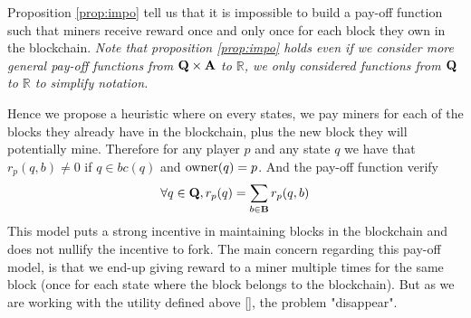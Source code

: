 Proposition \ref{prop:impo} tell us that it is impossible to build a pay-off function such that miners receive reward once and only once for each block they own in the blockchain. \textit{Note that proposition \ref{prop:impo} holds even if we consider more general pay-off functions from $\mathbf{Q} \times \mathbf{A}$ to $\mathbb{R}$, we only considered functions from $\mathbf{Q}$ to $\mathbb{R}$ to simplify notation.}

\iffalse
\etienne{This part can go in relative work now i guess ? or a slightly different and shorter version. (To discuss with Marcelo)}
A pay-off function has been proposed in \cite{}, such that at every level of the state's tree only the first block which has been confirmed by $\delta \in \mathbb{N}$ blocks give reward to his owner. Due to this constraint if a fork longer than $\delta$ blocks would happen, some blocks belonging to the new blockchain won't give any reward to their owners. As a matter of fact the model nullify the incentive of performing a fork longer than $\delta$ \cite{}. One could argue that a fork longer than $\delta$ would destroy the market confidence and therefore can be ignored. It might be the case with the current state of crypto-currencies, but as the technology become more widely adopted (government or bank), such argument can not be use any-more.
\fi

Hence we propose a heuristic where on every states, we pay miners for each of the blocks they already have in the blockchain, plus the new block they will potentially mine. Therefore for any player $p$ and any state $q$ we have that $r_p(q,b) \neq 0$ if $q \in bc(q)$ and $\text{\rm owner}(q) = p$. And the pay-off function verify\begin{equation*}
\forall q \in \mathbf{Q}, r_p(q)= \sum_{b \in \text{\bf B}} r_p(q,b)
\end{equation*} 
This model puts a strong incentive in maintaining blocks in the blockchain and does not nullify the incentive to fork. The main concern regarding this pay-off model, is that we end-up giving reward to a miner multiple times for the same block (once for each state where the block belongs to the blockchain). But as we are working with the utility defined above \ref{}, the problem "disappear".

